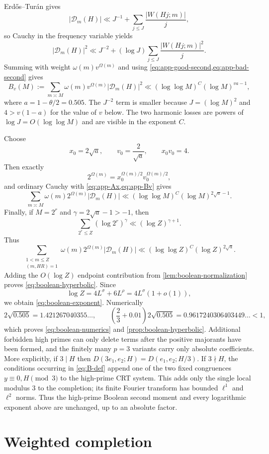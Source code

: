 \documentclass[11pt]{article}
\theoremstyle{definition}
\theoremstyle{remark}
\newcommand{\Dcal}{\mathcal D}
\newcommand{\1}{\mathbf 1}
\newcommand{\Om}{\Omega}
\newcommand{\om}{\omega}
\begin{document}
Erd\H{o}s--Tur\'an gives
\[
|\Dcal_m(H)|
\ll J^{-1}+\sum_{j\le J}\frac{|W(Hj;m)|}{j},
\]
so Cauchy in the frequency variable yields
\[
|\Dcal_m(H)|^2
\ll J^{-2}+(\log J)\sum_{j\le J}\frac{|W(Hj;m)|^2}{j}.
\]
Summing with weight $\om(m)v^{\Om(m)}$ and using
\cref{eq:app-good-second,eq:app-bad-second} gives
\begin{equation}\label{eq:app-Bv}
B_v(M)
:=\sum_{m\asymp M}\om(m)v^{\Om(m)}|\Dcal_m(H)|^2
\ll(\log\log M)^C(\log M)^{va-1},
\end{equation}
where $a=1-\theta/2=0.505$.  The $J^{-2}$ term is smaller because $J=(\log M)^2$ and
$4>v(1-a)$ for the value of $v$ below.  The two harmonic losses are powers of $\log J=O(\log\log M)$ and are visible in the exponent $C$.

Choose
\[
x_0=2\sqrt a,
\qquad v_0=\frac2{\sqrt a},
\qquad x_0v_0=4.
\]
Then exactly
\[
2^{\Om(m)}=x_0^{\Om(m)/2}v_0^{\Om(m)/2},
\]
and ordinary Cauchy with \cref{eq:app-Ax,eq:app-Bv} gives
\begin{equation}\label{eq:app-dyadic-boolean}
\sum_{m\asymp M}\om(m)2^{\Om(m)}|\Dcal_m(H)|
\ll(\log\log M)^C(\log M)^{2\sqrt a-1}.
\end{equation}
Finally, if $M=2^r$ and
$\gamma=2\sqrt a-1>-1$, then
\[
\sum_{2^r\le Z}(\log 2^r)^\gamma\ll(\log Z)^{\gamma+1}.
\]
Thus
\[
\sum_{\substack{1<m\le Z\\(m,HR)=1}}\om(m)2^{\Om(m)}|\Dcal_m(H)|
\ll(\log\log Z)^C(\log Z)^{2\sqrt a}.
\]
Adding the $O(\log Z)$ endpoint contribution from \cref{lem:boolean-normalization} proves \cref{eq:boolean-hyperbolic}.  Since
\[
\log Z=4L^\sigma+6L^\rho=4L^\sigma(1+o(1)),
\]
we obtain \cref{eq:boolean-exponent}.  Numerically
\[
2\sqrt{0.505}=1.421267040355\ldots,
\qquad
\left(\frac23+0.01\right)2\sqrt{0.505}
=0.9617240306403449\ldots<1,
\]
which proves \cref{eq:boolean-numerics} and \cref{prop:boolean-hyperbolic}.  Additional forbidden high primes can only delete terms after the positive majorants have been formed, and the finitely many $p=3$ variants carry only absolute coefficients.
More explicitly, if $3\mid H$ then
$D(3e_1,e_2;H)=D(e_1,e_2;H/3)$.  If $3\nmid H$, the conditions occurring in
\cref{eq:B-def} append one of the two fixed congruences $y\equiv0,H\pmod3$ to
the high-prime CRT system.  This adds only the single local modulus $3$ to
the completion; its finite Fourier transform has bounded $\ell^1$ and
$\ell^2$ norms.  Thus the high-prime Boolean second moment and every
logarithmic exponent above are unchanged, up to an absolute factor.

\section{Weighted completion}\label{app:completion}
\end{document}
